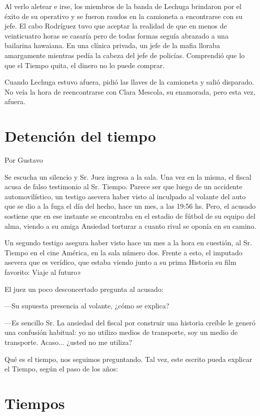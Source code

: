 \documentclass[11pt,twoside,openright,a5paper]{book}
\begin{document}
Al verlo aletear e irse, los miembros de la banda de Lechuga brindaron por el éxito de su operativo y se fueron raudos en la camioneta a encontrarse con su jefe. El cabo Rodríguez tuvo que aceptar la realidad de que en menos de veinticuatro horas se casaría pero de todas formas seguía abrazado a una bailarina hawaiana. En una clínica privada, un jefe de la mafia lloraba amargamente mientras pedía la cabeza del jefe de policías. Comprendió que lo que el Tiempo quita, el dinero no lo puede comprar.

Cuando Lechuga estuvo afuera, pidió las llaves de la camioneta y salió disparado. No veía la hora de reencontrarse con Clara Mescola, su enamorada, pero esta vez, afuera.

\section*{Detención del tiempo}

\begin{flushright}Por Gustavo\end{flushright}

Se escucha un silencio y Sr. Juez ingresa a la sala. Una vez en la misma, el fiscal acusa de falso testimonio al Sr. Tiempo. Parece ser que luego de un accidente automovilístico, un testigo asevera haber visto al inculpado al volante del auto que se dio a la fuga el día del hecho, hace un mes, a las 19:56 hs. Pero, el acusado sostiene que en ese instante se encontraba en el estadio de fútbol de su equipo del alma, viendo a su amiga Ansiedad torturar a cuanto rival se oponía en su camino.

Un segundo testigo asegura haber visto hace un mes a la hora en cuestión, al Sr. Tiempo en el cine América, en la sala número dos. Frente a esto, el imputado asevera que es verídico, que estaba viendo junto a su prima Historia su film favorito: Viaje al futuro»

El juez un poco desconcertado pregunta al acusado: 

---Su supuesta presencia al volante, ¿cómo se explica?

---Es sencillo Sr. La ansiedad del fiscal por construir una historia creíble le generó una confusión habitual: yo no utilizo medios de transporte, soy un medio de transporte. Acaso... ¿usted no me utiliza?

Qué es el tiempo, nos seguimos preguntando. Tal vez, este escrito pueda explicar el Tiempo, según el paso de los años:

\section*{Tiempos}
\end{document}
